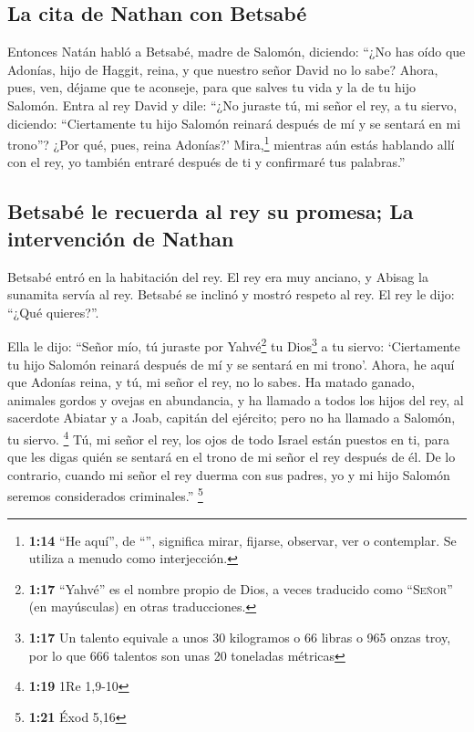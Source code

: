\hypertarget{la-cita-de-nathan-con-betsabuxe9}{%
\subsection{La cita de Nathan con
Betsabé}\label{la-cita-de-nathan-con-betsabuxe9}}

 Entonces Natán habló a Betsabé, madre de Salomón,
diciendo: ``¿No has oído que Adonías, hijo de Haggit, reina, y que
nuestro señor David no lo sabe?  Ahora, pues, ven, déjame
que te aconseje, para que salves tu vida y la de tu hijo Salomón.
 Entra al rey David y dile: ``¿No juraste tú, mi señor el
rey, a tu siervo, diciendo: ``Ciertamente tu hijo Salomón reinará
después de mí y se sentará en mi trono''? ¿Por qué, pues, reina
Adonías?'  Mira,\footnote{\textbf{1:14} ``He aquí'', de
  ``'', significa mirar, fijarse, observar, ver o
  contemplar. Se utiliza a menudo como interjección.} mientras aún estás
hablando allí con el rey, yo también entraré después de ti y confirmaré
tus palabras.''

\hypertarget{betsabuxe9-le-recuerda-al-rey-su-promesa-la-intervenciuxf3n-de-nathan}{%
\subsection{Betsabé le recuerda al rey su promesa; La intervención de
Nathan}\label{betsabuxe9-le-recuerda-al-rey-su-promesa-la-intervenciuxf3n-de-nathan}}

 Betsabé entró en la habitación del rey. El rey era muy
anciano, y Abisag la sunamita servía al rey.  Betsabé se
inclinó y mostró respeto al rey. El rey le dijo: ``¿Qué quieres?''.

 Ella le dijo: ``Señor mío, tú juraste por
Yahvé\footnote{\textbf{1:17} ``Yahvé'' es el nombre propio de Dios, a
  veces traducido como ``\textsc{Señor}'' (en mayúsculas) en otras
  traducciones.} tu Dios\footnote{\textbf{1:17} Un talento equivale a
  unos 30 kilogramos o 66 libras o 965 onzas troy, por lo que 666
  talentos son unas 20 toneladas métricas} a tu siervo: `Ciertamente tu
hijo Salomón reinará después de mí y se sentará en mi trono'.
 Ahora, he aquí que Adonías reina, y tú, mi señor el rey,
no lo sabes.  Ha matado ganado, animales gordos y ovejas
en abundancia, y ha llamado a todos los hijos del rey, al sacerdote
Abiatar y a Joab, capitán del ejército; pero no ha llamado a Salomón, tu
siervo. \footnote{\textbf{1:19} 1Re 1,9-10}  Tú, mi señor
el rey, los ojos de todo Israel están puestos en ti, para que les digas
quién se sentará en el trono de mi señor el rey después de él.
 De lo contrario, cuando mi señor el rey duerma con sus
padres, yo y mi hijo Salomón seremos considerados criminales.''
\footnote{\textbf{1:21} Éxod 5,16}

